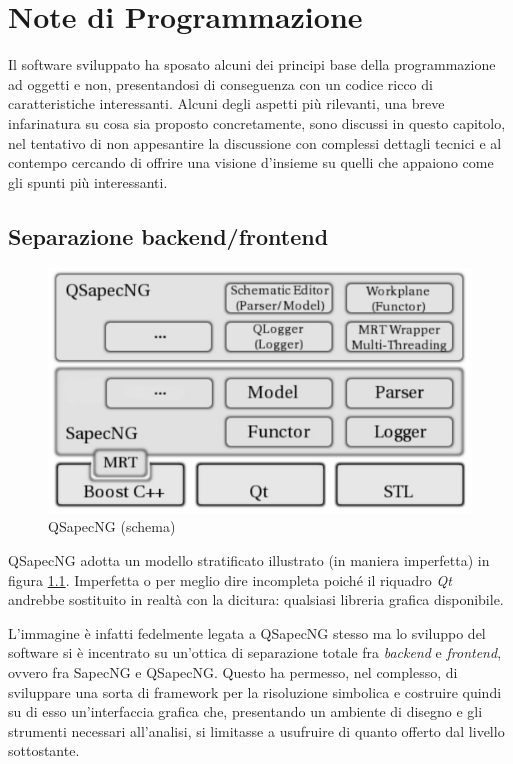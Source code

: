 \chapter{Note di Programmazione}

Il software sviluppato ha sposato alcuni dei principi base della programmazione ad oggetti e non, presentandosi di conseguenza con un codice ricco di caratteristiche interessanti. Alcuni degli aspetti più rilevanti, una breve infarinatura su cosa sia proposto concretamente, sono discussi in questo capitolo, nel tentativo di non appesantire la discussione con complessi dettagli tecnici e al contempo cercando di offrire una visione d'insieme su quelli che appaiono come gli spunti più interessanti.

\section{Separazione backend/frontend}

\begin{figure}
 \centering
 \includegraphics[scale=0.6]{immagini/qsapecngschema.pdf}
 \caption{QSapecNG (schema)}
 \label{fig:qsapecngschema}
\end{figure}

QSapecNG adotta un modello stratificato illustrato (in maniera imperfetta) in figura \ref{fig:qsapecngschema}. Imperfetta o per meglio dire incompleta poiché il riquadro \textit{Qt} andrebbe sostituito in realtà con la dicitura: qualsiasi libreria grafica disponibile.

L'immagine è infatti fedelmente legata a QSapecNG stesso ma lo sviluppo del software si è incentrato su un'ottica di separazione totale fra \textit{backend} e \textit{frontend}, ovvero fra SapecNG e QSapecNG. Questo ha permesso, nel complesso, di sviluppare una sorta di framework per la risoluzione simbolica e costruire quindi su di esso un'interfaccia grafica che, presentando un ambiente di disegno e gli strumenti necessari all'analisi, si limitasse a usufruire di quanto offerto dal livello sottostante.

